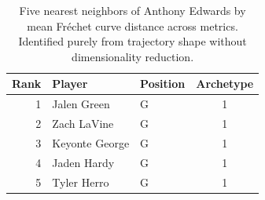 \begin{table}[htbp]
  \centering\small
  \begin{tabular}{rllc}
    \toprule
    Rank & Player & Position & Archetype \\
    \midrule
    1 & Jalen Green & G & 1 \\
    2 & Zach LaVine & G & 1 \\
    3 & Keyonte George & G & 1 \\
    4 & Jaden Hardy & G & 1 \\
    5 & Tyler Herro & G & 1 \\
    \bottomrule
  \end{tabular}
  \caption{Five nearest neighbors of Anthony Edwards by mean Fr\'{e}chet curve distance across metrics. Identified purely from trajectory shape without dimensionality reduction.}
  \label{tab:Anthony_Edwards_frechet_curve_neighbors}
\end{table}

